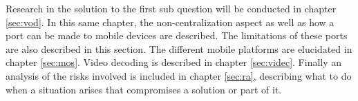 Research in the solution to the first sub question will be conducted in chapter \ref{sec:vod}. In this same chapter, the non-centralization aspect as well as how a port can be made to mobile devices are described. The limitations of these ports are also described in this section. The different mobile platforms are elucidated in chapter \ref{sec:mos}. Video decoding is described in chapter \ref{sec:videc}. Finally an analysis of the risks involved is included in chapter \ref{sec:ra}, describing what to do when a situation arises that compromises a solution or part of it.